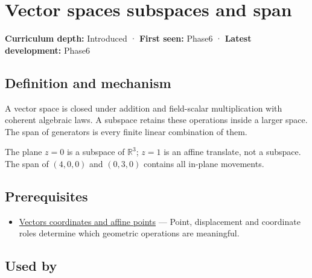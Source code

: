\hypertarget{appendix-173b52c063ae}{}\label{referencestart:appendix-173b52c063ae}
\section{Vector spaces subspaces and span}\label{appendix-173b52c063ae-vector-spaces-subspaces-and-span}

\hypertarget{appendix-173b52c063ae-vector-spaces-subspaces-and-span}{}

\textbf{Curriculum depth:} Introduced · \textbf{First seen:} Phase6 · \textbf{Latest development:} Phase6

\begin{allmightroledefinition}

\subsection{Definition and mechanism}\label{appendix-173b52c063ae-definition-and-mechanism}

\hypertarget{appendix-173b52c063ae-definition-and-mechanism}{}

A vector space is closed under addition and field-scalar multiplication with coherent algebraic laws. A subspace retains these operations inside a larger space. The span of generators is every finite linear combination of them.

\end{allmightroledefinition}

The plane \(z=0\) is a subspace of \(\mathbb R^3\); \(z=1\) is an affine translate, not a subspace. The span of \((4,0,0)\) and \((0,3,0)\) contains all in-plane movements.

\subsection{Prerequisites}\label{appendix-173b52c063ae-prerequisites}

\hypertarget{appendix-173b52c063ae-prerequisites}{}

\begin{itemize}
\tightlist
\item
  \hyperref[appendix-0659864c0aa3]{Vectors coordinates and affine points} --- Point, displacement and coordinate roles determine which geometric operations are meaningful.
\end{itemize}

\subsection{Used by}\label{appendix-173b52c063ae-used-by}

